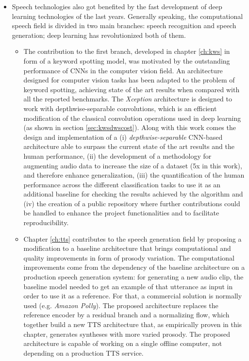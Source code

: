 \begin{itemize}
\item Speech technologies also got benefited by the fast development of deep learning technologies of the last years. Generally speaking, the computational speech field is divided in two main branches: speech recognition and speech generation; deep learning has revolutionized both of them. 
	\begin{itemize}
		\item The contribution to the first branch, developed in chapter \ref{ch:kws} in form of a keyword spotting model, was motivated by the outstanding performance of CNNs in the computer vision field. An architecture designed for computer vision tasks has been adapted to the problem of keyword spotting, achieving state of the art results when compared with all the reported benchmarks. The \textit{Xception} architecture is designed to work with depthwise-separable convolutions, which is an efficient modification of the classical convolution operations used in deep learning (as shown in section \ref{sec:kwsdwscost}). Along with this work comes the design and implementation of a (i) \textit{depthwise-separable} CNN-based architecture able to surpass the current state of the art results and the human performance, (ii) the development of a methodology for augmenting audio data to increase the size of a dataset (5x in this work), and therefore enhance generalization, (iii) the quantification of the human performance across the different classification tasks to use it as an additional baseline for checking the results achieved by the algorithm and (iv) the creation of a public repository where further contributions could be handled to enhance the project functionalities and to facilitate reproducibility.
		\item Chapter \ref{ch:tts} contributes to the speech generation field by proposing a modification to a baseline architecture that brings computational and quality improvements in form of prosody variation. The computational improvements come from the dependency of the baseline architecture on a production speech generation system: for generating a new audio clip, the baseline model needed to get an example of that utterance as input in order to use it as a reference. For that, a commercial solution is normally used (e.g. \textit{Amazon Polly}). The proposed architecture replaces the reference encoder by a residual branch and a normalizing flow, which together build a new TTS architecture that, as empirically proven in this chapter, generates syntheses with more varied prosody. The proposed architecture is capable of working on a single offline computer, not depending on a production TTS service. 
	\end{itemize}
\end{itemize}

